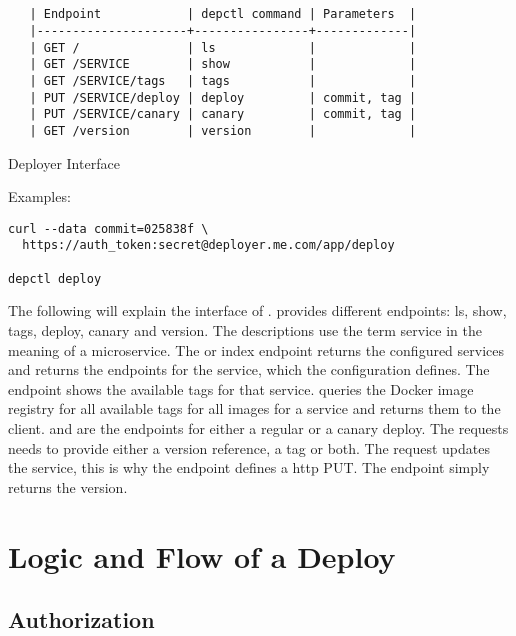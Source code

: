 \begin{table}[!htbp]
\begin{verbatim}


   | Endpoint            | depctl command | Parameters  |
   |---------------------+----------------+-------------|
   | GET /               | ls             |             |
   | GET /SERVICE        | show           |             |
   | GET /SERVICE/tags   | tags           |             |
   | PUT /SERVICE/deploy | deploy         | commit, tag |
   | PUT /SERVICE/canary | canary         | commit, tag |
   | GET /version        | version        |             |

\end{verbatim}
\caption{Deployer Interface}
\label{tab:interface}
\end{table}
Examples:
\begin{verbatim}
curl --data commit=025838f \
  https://auth_token:secret@deployer.me.com/app/deploy

depctl deploy
\end{verbatim}

The following will explain the interface of \deployer{}. \deployer{} provides different
endpoints: ls, show, tags, deploy, canary and version. The descriptions use the
term service in the meaning of a microservice. The \myemph{ls} or index endpoint returns the configured services and returns the endpoints
for the service, which the configuration defines.
The  endpoint shows the available tags for that service. \deployer{} queries the
Docker image registry for all available tags for all images for a service and returns them
to the client.
 and  are the endpoints for either a regular or a canary
deploy. The requests needs to provide either a version reference, a tag or both. The
request updates the service, this is why the endpoint defines a \gls{http} PUT.
The \myemph{version} endpoint simply returns the \deployer{} version.

\section{Logic and Flow of a Deploy}

\subsection{Authorization}

